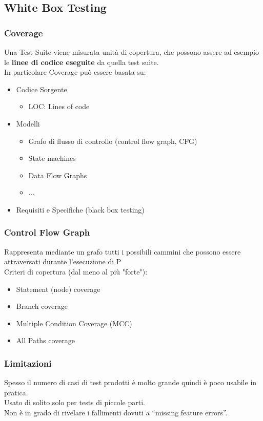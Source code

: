 \subsection{White Box Testing}
\subsubsection{Coverage}
Una Test Suite viene misurata unità di copertura, che possono assere ad esempio le \textbf{linee di codice eseguite} da quella test suite.\\
In particolare Coverage può essere basata su:
\begin{itemize}
    \item Codice Sorgente
    \begin{itemize}
        \item LOC: Lines of code
    \end{itemize}
    
    \item Modelli
    \begin{itemize}
        \item Grafo di flusso di controllo (control flow graph, CFG)
        \item State machines
        \item Data Flow Graphs
        \item ...
    \end{itemize}
    
    \item Requisiti e Specifiche (black box testing)
\end{itemize}

\subsubsection{Control Flow Graph}
Rappresenta mediante un grafo tutti i possibili cammini che possono essere attraversati durante l’esecuzione di P\\
Criteri di copertura (dal meno al più "forte"):
\begin{itemize}
    \item Statement (node) coverage 
    \item Branch coverage
    \item Multiple Condition Coverage (MCC)
    \item All Paths coverage
\end{itemize}

\subsubsection{Limitazioni}
Spesso il numero di casi di test prodotti è molto grande quindi \`e poco usabile in pratica.\\
Usato di solito solo per tests di piccole parti.\\
Non è in grado di rivelare i fallimenti dovuti a “missing feature errors”.

